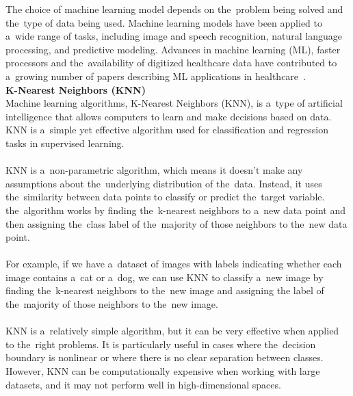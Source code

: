 The choice of machine learning model depends on the~problem being solved and the~type of data being used. Machine
learning models have been applied to a~wide range of tasks, including image and speech recognition, natural language
processing, and predictive modeling. Advances in machine learning (ML), faster processors and the~availability of
digitized healthcare data have contributed to a~growing number of papers describing ML applications in healthcare~\cite{Chen}.\\
\newpage
\noindent \textbf{K-Nearest Neighbors (KNN)} \label{sec:knn}\\
Machine learning algorithms, K-Nearest Neighbors (KNN), is a~type of artificial intelligence that allows
computers to learn and make decisions based on data. KNN is a~simple yet effective algorithm used for
classification and regression tasks in supervised learning.\\
\\
KNN is a~non-parametric algorithm, which means it doesn't make any assumptions about the~underlying
distribution of the~data. Instead, it uses the~similarity between data points to classify or predict the~target
variable. the~algorithm works by finding the~k-nearest neighbors to a~new data point and then assigning the~class
label of the~majority of those neighbors to the~new data point.\\
\\
For example, if we have a~dataset of images with labels indicating whether each image contains a~cat or a~dog,
we can use KNN to classify a~new image by finding the~k-nearest neighbors to the~new image and assigning the
label of the~majority of those neighbors to the~new image.\\
\\
KNN is a~relatively simple algorithm, but it can be very effective when applied to the~right problems.
It is particularly useful in cases where the~decision boundary is nonlinear or where there is no clear
separation between classes. However, KNN can be computationally expensive when working with large datasets, and
it may not perform well in high-dimensional spaces.


